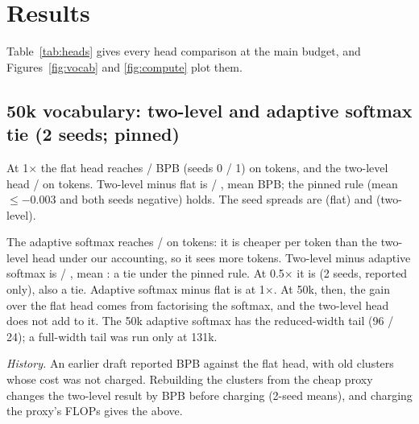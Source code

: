 \documentclass[11pt]{article}
\theoremstyle{remark}
\begin{document}
\section{Results}\label{sec:results}
Table~\ref{tab:heads} gives every head comparison at the main budget, and Figures~\ref{fig:vocab} and \ref{fig:compute} plot them.

\begin{table}[t]
\centering\small

\caption{FineWeb-Edu validation BPB ($d=384$) at 0.5$\times$ and 1$\times$ the main budget of \TargetFlops{} training FLOPs,
and out-of-domain BPB at 1$\times$. Two-level rows are charged with the proxy's FLOPs, except $^\dagger$: the 131k two-level
0.5$\times$ points are uncharged (no charged 0.5$\times$ branch was saved; the proxy would be twice as large a share of that
budget as at 1$\times$).}
\label{tab:heads}
\end{table}

\subsection{50k vocabulary: two-level and adaptive softmax tie (2 seeds; pinned)}\label{sec:fifty}
At 1$\times$ the flat head reaches \MainFlatZero{} / \MainFlatOne{} BPB (seeds 0 / 1) on \MainTokFlat{} tokens, and the
two-level head \MainTwoZero{} / \MainTwoOne{} on \MainTokTwo{} tokens. Two-level minus flat is \MainDZero{} / \MainDOne{},
mean \Headline{} BPB; the pinned rule (mean $\le -0.003$ and both seeds negative) holds. The seed spreads are \MainSpreadFlat{}
(flat) and \MainSpreadTwo{} (two-level).

The adaptive softmax reaches \AsFiftyOneZero{} / \AsFiftyOneOne{} on \AsTok{} tokens: it is cheaper per token than the two-level
head under our accounting, so it sees more tokens. Two-level minus adaptive softmax is \AsTlOneZero{} / \AsTlOneOne{}, mean
\AsTlOneMean{}: a tie under the pinned rule. At 0.5$\times$ it is \AsTlHalfMean{} (2 seeds, reported only), also a tie. Adaptive
softmax minus flat is \AsFlatOneMean{} at 1$\times$. At 50k, then, the gain over the flat head comes from factorising the softmax,
and the two-level head does not add to it. The 50k adaptive softmax has the reduced-width tail (96 / 24); a full-width tail was
run only at 131k.

\emph{History.} An earlier draft reported \HeadlineOld{} BPB against the flat head, with old clusters whose cost was not
charged. Rebuilding the clusters from the cheap proxy changes the two-level result by \ClusterSourceEffect{} BPB before charging (2-seed means), and charging the proxy's FLOPs gives the \Headline{} above.
\end{document}
